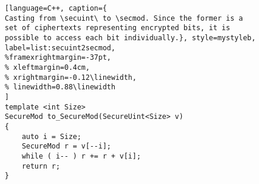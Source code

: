 \begin{figure}[t]
\begin{minipage}{\linewidth}
\begin{lstlisting}[language=C++, caption={
Casting from \secuint\ to \secmod. Since the former is a set of ciphertexts representing encrypted bits, it is possible to access each bit individually.}, style=mystyleb, label=list:secuint2secmod,
%framexrightmargin=-37pt,
% xleftmargin=0.4cm,
% xrightmargin=-0.12\linewidth,
% linewidth=0.88\linewidth
]
template <int Size>
SecureMod to_SecureMod(SecureUint<Size> v)
{
    auto i = Size;
    SecureMod r = v[--i];
    while ( i-- ) r += r + v[i];
    return r;
}
\end{lstlisting}
\end{minipage}
\vspace{-0.5cm} 
\end{figure}
